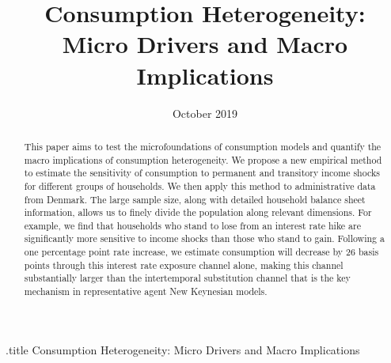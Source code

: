 \documentclass[titlepage]{\econtex}\newcommand{\texname}{ConsumptionHeterogeneity}
\begin{document}


%
\begin{verbatimwrite}{\jobname.title}
Consumption Heterogeneity: Micro Drivers and Macro Implications
\end{verbatimwrite}


\title{ 
	\bigskip
	\bigskip
	Consumption Heterogeneity: \\ Micro Drivers and Macro Implications}



\date{October 2019}
\maketitle


\begin{abstract}
	This paper aims to test the microfoundations of consumption models and quantify the macro implications of consumption heterogeneity. We propose a new empirical method to estimate the sensitivity of consumption to permanent and transitory income shocks for different groups of households. We then apply this method to administrative data from Denmark. The large sample size, along with detailed household balance sheet information, allows us to finely divide the population along relevant dimensions. For example, we find that households who stand to lose from an interest rate hike are significantly more sensitive to income shocks than those who stand to gain. Following a one percentage point rate increase, we estimate consumption will decrease by 26 basis points through this interest rate exposure channel alone, making this channel substantially larger than the intertemporal substitution channel that is the key mechanism in representative agent New Keynesian models.
%  
\end{abstract}
\end{document}
